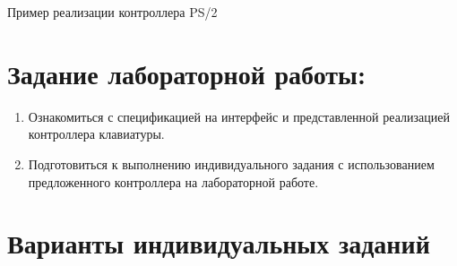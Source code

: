 %



\begin{longlisting}
	\inputminted{SystemVerilog}{code_examples/lab_6/ps2.sv}
	\caption{Пример реализации контроллера PS/2}
\end{longlisting}

\section{Задание лабораторной работы:}
\begin{enumerate}%

\item{Ознакомиться с спецификацией на интерфейс  и представленной реализацией контроллера клавиатуры.}


\item{Подготовиться к выполнению индивидуального задания с использованием предложенного контроллера на лабораторной работе.}

\end{enumerate}





\section{Варианты индивидуальных заданий}


